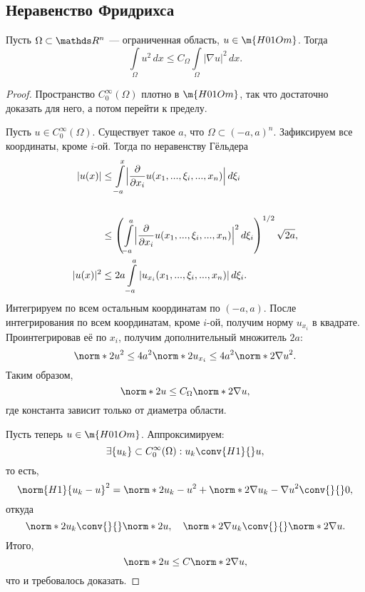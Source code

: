 
\subsection{Неравенство Фридрихса}
\begin{theorem} Пусть $\Omega \subset \real^n$ --- ограниченная область, $u \in \m{H01Om}$. Тогда
$$ \int \limits_\Omega u^2 \, dx \leq C_\Omega \int \limits_\Omega |\nabla u|^2 \, dx.$$
\end{theorem}
\begin{proof} Пространство $C_0^\infty(\Omega)$ плотно в $\m{H01Om}$, так что достаточно доказать для него, а потом перейти к пределу.

Пусть $u \in C_0^\infty(\Omega)$. Существует такое $a$, что $\Omega \subset (-a,a)^n.$ Зафиксируем все координаты, кроме $i$-ой. Тогда по неравенству Гёльдера
\begin{align*}
|u(x)| &\leq \int \limits_{-a}^x \Bigl\lvert \frac{\partial}{\partial x_i} u(x_1, ..., \xi_i, ..., x_n) \Bigr\rvert \, d \xi_i \\ \\
& \leq \left( \int \limits_{-a}^a \Bigl\lvert \frac{\partial}{\partial x_i} u(x_1, ..., \xi_i, ..., x_n)  \Bigr\rvert^2 \, d\xi_i\right)^{1/2} \sqrt{2a},\\
|u(x)|^2 &\leq 2a \int \limits_{-a}^a | u_{x_i} (x_1, ..., \xi_i, ..., x_n) | \, d\xi_i.
\end{align*}
Интегрируем по всем остальным координатам по $(-a, a)$. После интегрирования по всем координатам, кроме $i$-ой, получим норму $u_{x_i}$ в квадрате. Проинтегрировав её по $x_i$, получим дополнительный множитель $2a$:
$$ \norm*{2}{u}^2 \leq 4a^2 \norm*{2}{u_{x_i}} \leq 4a^2 \norm*{2}{\nabla u}^2.$$
Таким образом,
$$\norm*{2}{u} \leq C_\Omega \norm*{2}{\nabla u},$$
где константа зависит только от диаметра области.

Пусть теперь $u \in \m{H01Om}$. Аппроксимируем:
$$ \exists \{u_k \} \subset C_0^\infty(\Omega) : u_k  \conv{H1}{} u,$$
то есть,
$$ \norm{H1}{u_k - u}^2 = \norm*{2}{u_k - u}^2 + \norm*{2}{\nabla u_k - \nabla u}^2 \conv{}{} 0,$$
откуда
$$\norm*{2}{u_k} \conv{}{} \norm*{2}{u}, \quad \norm*{2}{\nabla u_k} \conv{}{} \norm*{2}{\nabla u}.$$
Итого,
$$ \norm*{2}{u} \leq C \norm*{2}{\nabla u},$$
что и требовалось доказать.
\end{proof}

